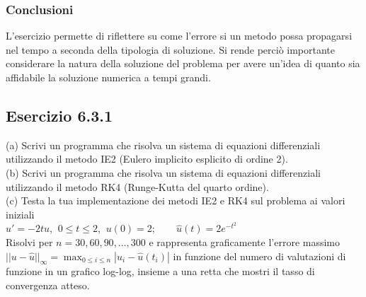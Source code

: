\documentclass[letterpaper, 12pt]{article}
\numberwithin{equation}{section}    %
\begin{document}
\subsubsection{Conclusioni}
L'esercizio permette di riflettere su come l'errore si un metodo possa propagarsi nel tempo a seconda della
tipologia di soluzione. Si rende perciò importante considerare la natura della soluzione del problema 
per avere un'idea di quanto sia affidabile la soluzione numerica a tempi grandi.

\subsection{Esercizio 6.3.1}
(a) Scrivi un programma che risolva un sistema di equazioni differenziali utilizzando il metodo IE2 
(Eulero implicito esplicito di ordine 2).\\
(b) Scrivi un programma che risolva un sistema di equazioni differenziali utilizzando il metodo RK4 
(Runge-Kutta del quarto ordine).\\
(c) Testa la tua implementazione dei metodi IE2 e RK4 sul problema ai valori iniziali\\

$u' = -2t u$, $\ 0 \le t \le 2$, $\ u(0) = 2; \qquad \hat{u}(t) = 2e^{-t^2}$ \\

Risolvi per $n=30,60,90,\ldots,300$ e rappresenta graficamente l'errore massimo 
$||u-\hat{u}||_\infty=\max_{0\leq i\leq n} |u_i-\hat{u}(t_i)|$ in funzione del numero di valutazioni 
di funzione in un grafico log-log, insieme a una retta che mostri il tasso di convergenza atteso.
\end{document}
